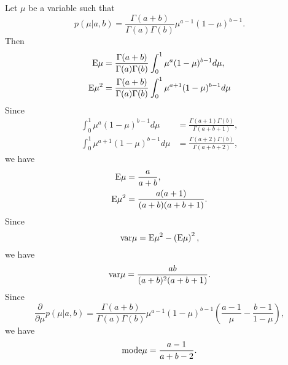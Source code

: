 \subsection{}
\label{2.6}
Let $\mu$ be a variable such that
%
\begin{equation}
p(\mu | a, b) = \frac{\Gamma(a + b)}{\Gamma(a) \Gamma(b)} \mu ^ {a - 1} (1 - \mu) ^ {b - 1}.
\end{equation}
%
Then
%
\begin{equation}
\begin{aligned}
{\rm E} \mu &= \frac{\Gamma(a + b)}{\Gamma(a) \Gamma(b)} \int_{0}^{1} \mu ^ a (1 - \mu) ^ {b - 1} d\mu, \\
{\rm E} \mu ^ 2 &= \frac{\Gamma(a + b)}{\Gamma(a) \Gamma(b)} \int_{0}^{1} \mu ^ {a + 1} (1 - \mu) ^ {b - 1} d\mu
\end{aligned}
\end{equation}
%
Since
%
\begin{equation}
\begin{aligned}
\int_{0}^{1} \mu ^ a (1 - \mu) ^ {b - 1} d\mu &= \frac{\Gamma (a + 1) \Gamma (b)}{\Gamma (a + b + 1)}, \\
\int_{0}^{1} \mu ^ {a + 1} (1 - \mu) ^ {b - 1} d\mu &= \frac{\Gamma (a + 2) \Gamma (b)}{\Gamma (a + b + 2)},
\end{aligned}
\end{equation}
%
we have
%
\begin{equation}
\begin{aligned}
{\rm E} \mu &= \frac{a}{a + b}, \\
{\rm E} \mu ^ 2 &= \frac{a (a + 1)}{(a + b) (a + b + 1)}.
\end{aligned}
\end{equation}
%
Since
%
\begin{equation}
{\rm var} \mu = {\rm E} \mu ^ 2 - \left( {\rm E \mu} \right) ^ 2,
\end{equation}
%
we have
%
\begin{equation}
{\rm var} \mu = \frac{a b}{(a + b) ^ 2 (a + b + 1)}.
\end{equation}
%
Since
%
\begin{equation}
\frac{\partial}{\partial \mu} p( \mu | a, b) = \frac{\Gamma(a + b)}{\Gamma(a) \Gamma(b)} \mu ^ {a - 1} (1 - \mu) ^ {b - 1} \left( \frac{a - 1}{\mu} - \frac{b - 1}{1 - \mu} \right),
\end{equation}
%
we have
%
\begin{equation}
{\rm mode} \mu = \frac{a - 1}{a + b - 2}.
\end{equation}
%









































